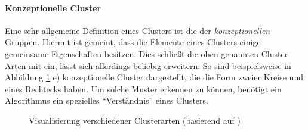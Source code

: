 \paragraph{Konzeptionelle Cluster}
Eine sehr allgemeine Definition eines Clusters ist die der \textit{konzeptionellen} Gruppen. Hiermit ist
gemeint, dass die Elemente eines Clusters einige gemeinsame Eigenschaften besitzen. Dies schließt die oben genannten
Cluster-Arten mit ein, lässt sich allerdings beliebig erweitern. So sind beispielsweise in Abbildung \ref{fig:basic_cluster_style} e)
konzeptionelle Cluster dargestellt, die die Form zweier Kreise und eines Rechtecks haben. Um solche Muster
erkennen zu können, benötigt ein Algorithmus ein spezielles ``Verständnis'' eines Clusters.

\begin{figure}[H]
    \centering
    \qquad
    \qquad
    \hfill
    \qquad
    \qquad
    \hfill
    \caption[Visualisierung verschiedener Clusterarten]{Visualisierung verschiedener Clusterarten (basierend auf \cite[]{tan2007introduction})}
    \label{fig:basic_cluster_style}
\end{figure}

